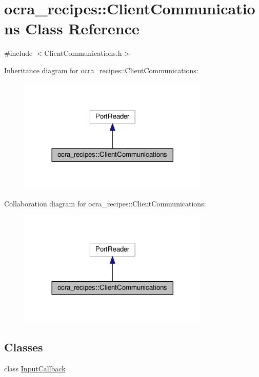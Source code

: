\hypertarget{classocra__recipes_1_1ClientCommunications}{}\section{ocra\+\_\+recipes\+:\+:Client\+Communications Class Reference}
\label{classocra__recipes_1_1ClientCommunications}


{\ttfamily \#include $<$Client\+Communications.\+h$>$}



Inheritance diagram for ocra\+\_\+recipes\+:\+:Client\+Communications\+:
\nopagebreak
\begin{figure}[H]
\begin{center}
\leavevmode
\includegraphics[width=257pt]{d5/d62/classocra__recipes_1_1ClientCommunications__inherit__graph}
\end{center}
\end{figure}


Collaboration diagram for ocra\+\_\+recipes\+:\+:Client\+Communications\+:
\nopagebreak
\begin{figure}[H]
\begin{center}
\leavevmode
\includegraphics[width=257pt]{d9/dd7/classocra__recipes_1_1ClientCommunications__coll__graph}
\end{center}
\end{figure}
\subsection*{Classes}
\begin{DoxyCompactItemize}
\item 
class \hyperlink{classocra__recipes_1_1ClientCommunications_1_1InputCallback}{Input\+Callback}
\end{DoxyCompactItemize}
